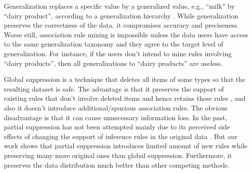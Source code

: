 Generalization replaces a specific value by
a generalized value, e.g., ``milk'' by ``dairy product'',
according to a generalization hierarchy \cite{FungWCY10:Survey}.
While generalization preserves the correctness of the data,
it compromises accuracy
and preciseness. Worse still, association rule mining is impossible
unless the data users have access to the same generalization taxonomy
and they agree to the target level of generalization. For instance, if
the users don't intend to mine rules involving ``dairy products'', then
all generalizations to ``dairy products'' are useless.

Global suppression is a technique that deletes all items of some types
so that the resulting dataset is safe. 
The advantage is that it preserves the support of
existing rules that don't involve deleted items and hence retains these rules
\cite{Xu:2008:ATD}, and also it doesn't introduce
additional/spurious association rules.
The obvious disadvantage is that it can cause unnecessary
information loss. In the past, partial suppression
has not been attempted mainly due to its perceived side effects of 
changing the support of inference rules in the original data 
\cite{Xu:2008:ATD,Cao:2010:rho,tkde:VerykiosEBSD04:ARH,tkde:WuCC07:hiding}. 
But our work shows that partial suppression introduces limited
amount of new rules while preserving many more original ones than
global suppression. Furthermore,
it preserves the data distribution much better than
other competing methods.


